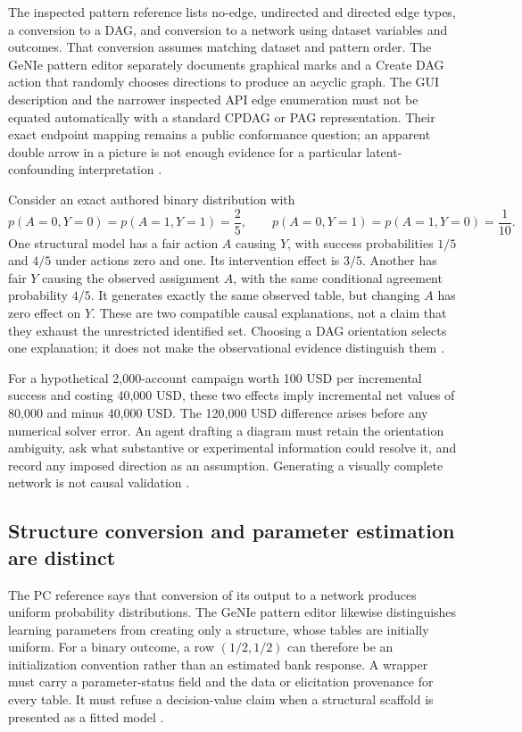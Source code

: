 The inspected pattern reference lists no-edge, undirected and directed edge
types, a conversion to a DAG, and conversion to a network using dataset
variables and outcomes. That conversion assumes matching dataset and
pattern order. The GeNIe pattern editor separately documents graphical
marks and a Create DAG action that randomly chooses directions to produce
an acyclic graph. The GUI description and the narrower inspected API edge
enumeration must not be equated automatically with a standard CPDAG or PAG
representation. Their exact endpoint mapping remains a public conformance
question; an apparent double arrow in a picture is not enough evidence
for a particular latent-confounding interpretation
\cite{exec13_smile_pattern,exec13_genie_pattern,exec24_smile_choice}.

Consider an exact authored binary distribution with
\[
 p(A=0,Y=0)=p(A=1,Y=1)=\frac25,\qquad
 p(A=0,Y=1)=p(A=1,Y=0)=\frac1{10}.
\]
One structural model has a fair action $A$ causing $Y$, with success
probabilities $1/5$ and $4/5$ under actions zero and one. Its intervention
effect is $3/5$. Another has fair $Y$ causing the observed assignment $A$,
with the same conditional agreement probability $4/5$. It generates exactly
the same observed table, but changing $A$ has zero effect on $Y$.
These are two compatible causal explanations, not a claim that they exhaust
the unrestricted identified set. Choosing a DAG orientation selects one
explanation; it does not make the observational evidence distinguish them
\cite{exec24_smile_choice}.

For a hypothetical 2,000-account campaign worth 100 USD per incremental
success and costing 40,000 USD, these two effects imply incremental net
values of 80,000 and minus 40,000 USD. The 120,000 USD difference arises
before any numerical solver error. An agent drafting a diagram must retain
the orientation ambiguity, ask what substantive or experimental information
could resolve it, and record any imposed direction as an assumption.
Generating a visually complete network is not causal validation
\cite{exec24_smile_choice}.

\subsection{Structure conversion and parameter estimation are distinct}
The PC reference says that conversion of its output to a network produces
uniform probability distributions. The GeNIe pattern editor likewise
distinguishes learning parameters from creating only a structure, whose
tables are initially uniform. For a binary outcome, a row $(1/2,1/2)$ can
therefore be an initialization convention rather than an estimated bank
response. A wrapper must carry a parameter-status field and the data or
elicitation provenance for every table. It must refuse a decision-value
claim when a structural scaffold is presented as a fitted model
\cite{exec13_smile_pc,exec13_genie_pattern,exec24_smile_choice}.

